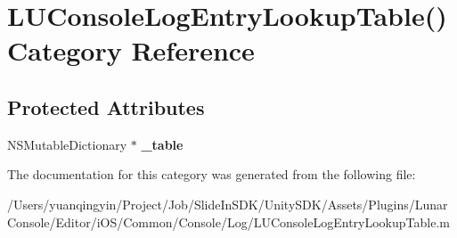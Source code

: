 \hypertarget{category_l_u_console_log_entry_lookup_table_07_08}{}\section{L\+U\+Console\+Log\+Entry\+Lookup\+Table() Category Reference}
\label{category_l_u_console_log_entry_lookup_table_07_08}
\subsection*{Protected Attributes}
\begin{DoxyCompactItemize}
\item 
\mbox{\label{category_l_u_console_log_entry_lookup_table_07_08_a3c04463931f5640f688215523d647bfa}} 
N\+S\+Mutable\+Dictionary $\ast$ {\bfseries \+\_\+table}
\end{DoxyCompactItemize}


The documentation for this category was generated from the following file\+:\begin{DoxyCompactItemize}
\item 
/\+Users/yuanqingyin/\+Project/\+Job/\+Slide\+In\+S\+D\+K/\+Unity\+S\+D\+K/\+Assets/\+Plugins/\+Lunar\+Console/\+Editor/i\+O\+S/\+Common/\+Console/\+Log/L\+U\+Console\+Log\+Entry\+Lookup\+Table.\+m\end{DoxyCompactItemize}
